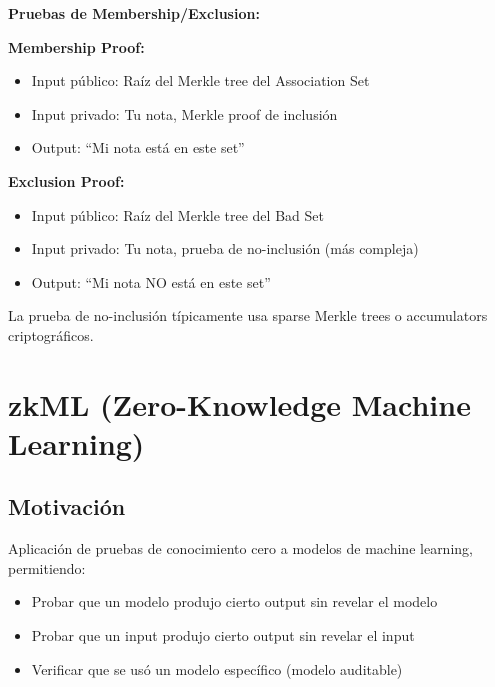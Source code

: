 \documentclass[11pt,a4paper,twoside]{book}
\begin{document}
\begin{mathnote}
\textbf{Pruebas de Membership/Exclusion:}

\textbf{Membership Proof:}
\begin{itemize}
    \item Input p\'ublico: Ra\'iz del Merkle tree del Association Set
    \item Input privado: Tu nota, Merkle proof de inclusi\'on
    \item Output: ``Mi nota est\'a en este set''
\end{itemize}

\textbf{Exclusion Proof:}
\begin{itemize}
    \item Input p\'ublico: Ra\'iz del Merkle tree del Bad Set
    \item Input privado: Tu nota, prueba de no-inclusi\'on (m\'as compleja)
    \item Output: ``Mi nota NO est\'a en este set''
\end{itemize}

La prueba de no-inclusi\'on t\'ipicamente usa sparse Merkle trees o accumulators criptogr\'aficos.
\end{mathnote}

\section{zkML (Zero-Knowledge Machine Learning)}
\label{sec:zkml}

\subsection{Motivaci\'on}

\begin{definition}[zkML]
Aplicaci\'on de pruebas de conocimiento cero a modelos de machine learning, permitiendo:
\begin{itemize}
    \item Probar que un modelo produjo cierto output sin revelar el modelo
    \item Probar que un input produjo cierto output sin revelar el input
    \item Verificar que se us\'o un modelo espec\'ifico (modelo auditable)
\end{itemize}
\end{definition}
\end{document}
